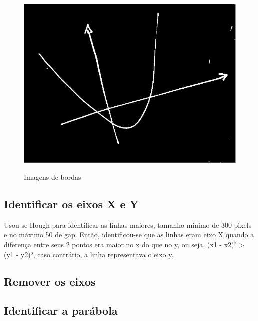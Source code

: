 \documentclass{article}
\begin{document}
\begin{figure}[h!]
        {\includegraphics[scale=0.17]{exemplo3_edge.PNG}}
    \caption{Imagens de bordas}
    \end{figure}

   \subsection{Identificar os eixos X e Y}
   Usou-se Hough para identificar as linhas maiores, tamanho mínimo de 300 pixels e no máximo 50 de gap. Então, identificou-se que as linhas eram eixo X quando a diferença entre seus 2 pontos era maior no x do que no y, ou seja, (x1 - x2)² > (y1 - y2)², caso contrário, a linha representava o eixo y.
   \subsection{Remover os eixos}
   \subsection{Identificar a parábola}
\end{document}
